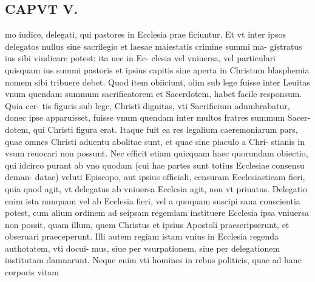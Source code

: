 \documentclass{article}
\begin{document}
\begin{pages}
\section*{CAPVT  V. }
\marginpar{[ p.243 ]}\pstart mo iudice, delegati, qui pastores in Ecclesia prae ficiuntur. Et vt inter ipsos delegatos nullus sine sacrilegio et laesae maiestatis crimine summi ma- gistratus ius sibi vindicare potest: ita nec in Ec- clesia vel vniuersa, vel particulari quisquam ius summi pastoris et ipsius capitis sine aperta in Christum blasphemia nomem sibi tribuere debet. Quod item obiiciunt, olim sub lege fuisse inter Leuitas vnum quendam summum sacrificatorem et Sacerdotem, habet facile responsum. Quia cer- tis figuris sub lege, Christi dignitas, vti Sacrificium adumbrabatur, donec ipse apparuisset, fuisse vnum quendam inter multos fratres summum Sacer- dotem, qui Christi figura erat. Itaque fuit ea res legalium caeremoniarum pars, quae omnes Christi aduentu abolitae sunt, et quae sine piaculo a Chri- stianis in vsum reuocari non possunt.  \pend\pstart Nec efficit etiam quicquam haec quorundam obiectio, qui idcirco purant ab vno quodam (cui hae partes sunt totius Ecclesiae consensu deman- datae) veluti Episcopo, aut ipsius officiali, censuram Ecclesiasticam fieri, quia quod agit, vt delegatus ab vniuersa Ecclesia agit, non vt priuatus. Delegatio enim ista nunquam vel ab Ecclesia fieri, vel a quoquam suscipi sana conscientia potest, cum alium ordinem ad seipsam regendam instituere Ecclesia ipsa vniuersa non possit, quam illum, quem Christus et ipsius Apostoli praescripserunt, et obseruari praeceperunt. Illi autem regiam istam vnius in Ecclesia regenda authotatem, vti docui- mus, siue per vsurpationem, siue per delegationem institutam damnarunt. Neque enim vti homines in rebus politicis, quae ad hanc corporis vitam  \pend

\end{pages}
\end{document}
